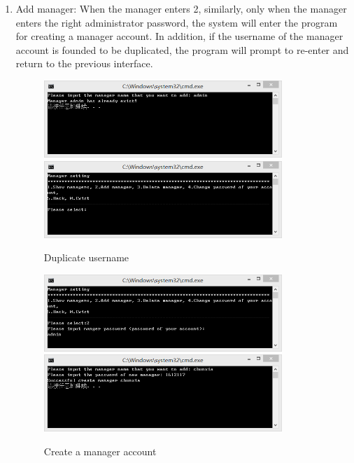 \documentclass{article}
\begin{document}
\begin{enumerate}
    \item Add manager:\newline 
    When the manager enters 2, similarly, only when the manager enters the right administrator password, the system will enter the program for creating a manager account. In addition, if the username of the manager account is founded to be duplicated, the program will prompt to re-enter and return to the previous interface.
        \begin{figure}[H]
        \centering
        \includegraphics[width=0.85\textwidth]{C/222233b.png}
        \includegraphics[width=0.85\textwidth]{C/222233d.png}
        \caption{Duplicate username}
        \end{figure}
        \begin{figure}[H]
        \centering
        \includegraphics[width=0.85\textwidth]{C/222233a.png}
        \includegraphics[width=0.85\textwidth]{C/222233c.png}
        \caption{Create a manager account}
        \end{figure}
        

\end{enumerate}
\end{document}
